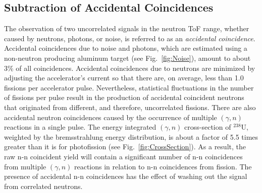 \subsection{Subtraction of Accidental Coincidences}
\label{Reconstruction of Accidental Coincidence}
The observation of two uncorrelated signals in the neutron ToF range, whether caused by neutrons, photons, or noise, is referred to as an \emph{accidental coincidence}.
Accidental coincidences due to noise and photons, which are estimated using a non-neutron producing aluminum target (see Fig.~\ref{fig:Noise}), amount to about 3\% of all coincidences.
Accidental coincidences due to neutrons are minimized by adjusting the accelerator's current so that there are, on average, less than 1.0 fissions per accelerator pulse.
Nevertheless, statistical fluctuations in the number of fissions per pulse result in the production of accidental coincident neutrons that originated from different, and therefore, uncorrelated fissions.
There are also accidental neutron coincidences caused by the occurrence of multiple $(\gamma, n)$ reactions in a single pulse.
The energy integrated $(\gamma, n)$ cross-section of $^{238}$U, weighted by the bremsstrahlung energy distribution, is about a factor of 5.5 times greater than it is for photofission (see Fig.~\ref{fig:CrossSection}).
As a result, the raw n-n coincident yield will contain a significant number of n-n coincidences from multiple $(\gamma, n)$ reactions in relation to n-n coincidences from fission.
The presence of accidental n-n coincidences has the effect of washing out the signal from correlated neutrons. 
